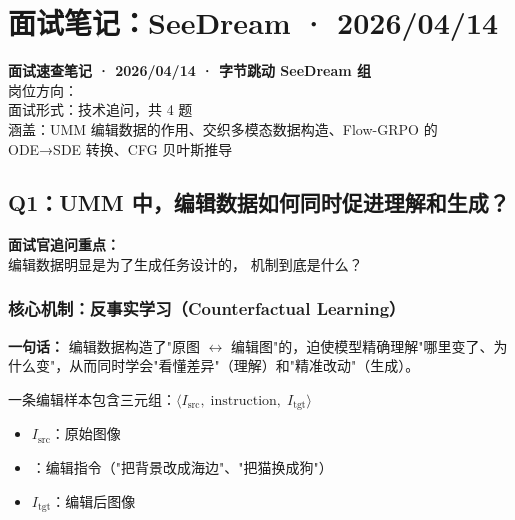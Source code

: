 
\section{面试笔记：SeeDream · 2026/04/14}

\begin{conceptbox}
\textbf{面试速查笔记 · 2026/04/14 · 字节跳动 SeeDream 组}\\
岗位方向：\\
面试形式：技术追问，共 4 题\\
涵盖：UMM 编辑数据的作用、交织多模态数据构造、Flow-GRPO 的 ODE→SDE 转换、CFG 贝叶斯推导
\end{conceptbox}

\subsection{Q1：UMM 中，编辑数据如何同时促进理解和生成？}

\begin{warnbox}
\textbf{面试官追问重点：}\\
编辑数据明显是为了生成任务设计的，
机制到底是什么？
\end{warnbox}

\subsubsection{核心机制：反事实学习（Counterfactual Learning）}

\begin{conceptbox}
\textbf{一句话：} 编辑数据构造了"原图 $\leftrightarrow$ 编辑图"的，迫使模型精确理解"哪里变了、为什么变"，从而同时学会"看懂差异"（理解）和"精准改动"（生成）。
\end{conceptbox}

一条编辑样本包含三元组：$\langle I_\text{src},\; \text{instruction},\; I_\text{tgt}\rangle$

\begin{itemize}[leftmargin=1.5em]
  \item $I_\text{src}$：原始图像
  \item {}：编辑指令（"把背景改成海边"、"把猫换成狗"）
  \item $I_\text{tgt}$：编辑后图像
\end{itemize}

